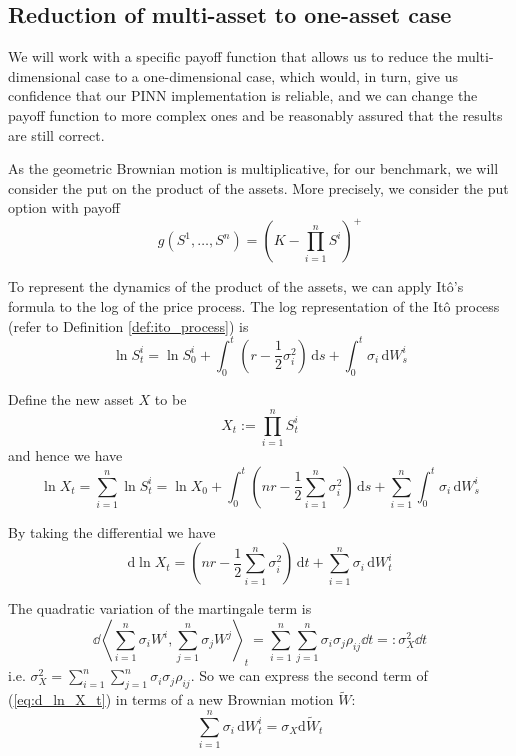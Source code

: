 \subsection{Reduction of multi-asset to one-asset case}

We will work with a specific payoff function that allows us to reduce the multi-dimensional case to a one-dimensional case, which would, in turn, give us confidence that our PINN implementation is reliable, and we can change the payoff function to more complex ones and be reasonably assured that the results are still correct.

As the geometric Brownian motion is multiplicative, for our benchmark, we will consider the put on the product of the assets. More precisely, we consider the put option with payoff
\begin{equation}
    g(S^1, \dots, S^n) = \left(K - \prod_{i=1}^n S^i\right)^+
\end{equation}

To represent the dynamics of the product of the assets, we can apply Itô’s formula to the log of the price process. The log representation of the Itô process (refer to Definition \ref{def:ito_process}) is
\begin{equation}
\ln S_t^i = \ln S_0^i + \int_0^t \left (r - \frac 12 \sigma^2_i\right) \,\mathrm ds + \int_0^t \sigma _i \,\mathrm dW_s^i
\end{equation}

Define the new asset $X$ to be
\begin{equation}X_t := \prod_{i=1}^n S^i_t\end{equation}
and hence we have
\begin{equation}
\ln X_t = \sum_{i=1}^n \ln S_t^i = \ln X_0 + \int_0^t \left(nr - \frac 12 \sum_{i=1}^n \sigma_i^2 \right)\,\mathrm ds + \sum_{i=1}^n \int_0^t \sigma_i \,\mathrm dW_s^i
\end{equation}

By taking the differential we have
\begin{equation}
\mathrm d\ln X_t = \left(nr - \frac 12 \sum_{i=1}^n \sigma_i^2 \right)\,\mathrm dt + \sum_{i=1}^n \sigma_i \,\mathrm dW_t^i
\label{eq:d_ln_X_t}
\end{equation}

The quadratic variation of the martingale term is
\begin{equation}
\dd \left\langle\sum_{i=1}^n \sigma_i W^i, \sum_{j=1}^n \sigma_j W^j\right\rangle_t = \sum_{i=1}^n\sum_{j=1}^n \sigma_i\sigma_j \rho_{ij} \dd t =: \sigma^2_X \dd t
\end{equation}
i.e. $\sigma_X^2 = \sum_{i=1}^n\sum_{j=1}^n \sigma_i\sigma_j\rho_{ij}$. So we can express the second term of (\ref{eq:d_ln_X_t}) in terms of a new Brownian motion $\widetilde W$:
\begin{equation}
\sum_{i=1}^n \sigma_i \,\mathrm dW_t^i =  \sigma_X \mathrm d\widetilde W_t
\end{equation}

